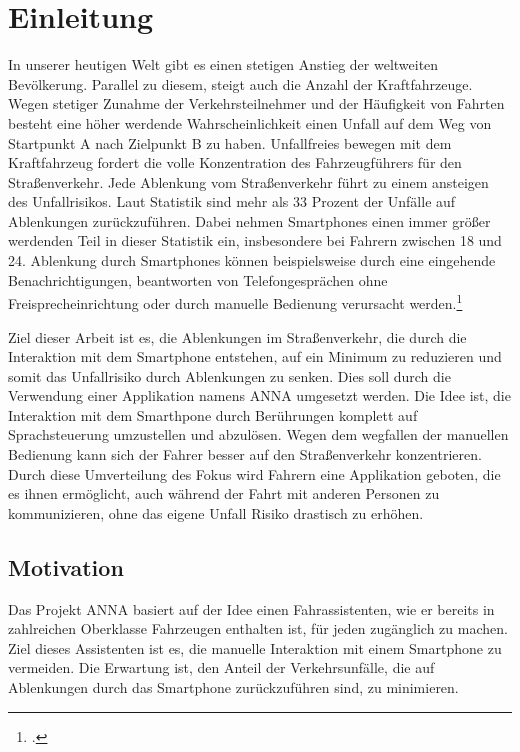 
\chapter{Einleitung}
In unserer heutigen Welt gibt es einen stetigen Anstieg der weltweiten Bevölkerung. Parallel zu diesem, steigt auch die Anzahl der Kraftfahrzeuge.
Wegen stetiger Zunahme der Verkehrsteilnehmer und der Häufigkeit von Fahrten besteht eine höher werdende Wahrscheinlichkeit einen Unfall auf dem Weg von Startpunkt A nach Zielpunkt B zu haben. Unfallfreies bewegen mit dem Kraftfahrzeug fordert die volle Konzentration des Fahrzeugführers für den Straßenverkehr. Jede Ablenkung vom Straßenverkehr führt zu einem ansteigen des Unfallrisikos.
Laut Statistik sind mehr als 33 Prozent der Unfälle auf Ablenkungen zurückzuführen.
Dabei nehmen Smartphones einen immer größer werdenden Teil in dieser Statistik ein, insbesondere bei Fahrern zwischen 18 und 24. Ablenkung durch Smartphones können beispielsweise durch eine eingehende Benachrichtigungen, beantworten von Telefongesprächen ohne Freisprecheinrichtung oder durch manuelle Bedienung verursacht werden.\footcite[vgl.:][]{heiseAblenkungSmartphone}

Ziel dieser Arbeit ist es, die Ablenkungen im Straßenverkehr, die durch die Interaktion mit dem Smartphone entstehen, auf ein Minimum zu reduzieren und somit das Unfallrisiko durch Ablenkungen zu senken. Dies soll durch die Verwendung einer Applikation namens \ac{ANNA} umgesetzt werden. Die Idee ist, die Interaktion mit dem Smarthpone durch Berührungen komplett auf Sprachsteuerung umzustellen und abzulösen. Wegen dem wegfallen der manuellen Bedienung kann sich der Fahrer besser auf den Straßenverkehr konzentrieren. Durch diese Umverteilung des Fokus wird Fahrern eine Applikation geboten, die es ihnen ermöglicht, auch während der Fahrt mit anderen Personen zu kommunizieren, ohne das eigene Unfall Risiko drastisch zu erhöhen.

\section{Motivation}
Das Projekt \ac{ANNA} basiert auf der Idee einen Fahrassistenten, wie er bereits in zahlreichen Oberklasse Fahrzeugen enthalten ist, für jeden zugänglich zu machen. Ziel dieses Assistenten ist es, die manuelle Interaktion mit einem Smartphone zu vermeiden. Die Erwartung ist, den Anteil der Verkehrsunfälle, die auf Ablenkungen durch das Smartphone zurückzuführen sind, zu minimieren.

